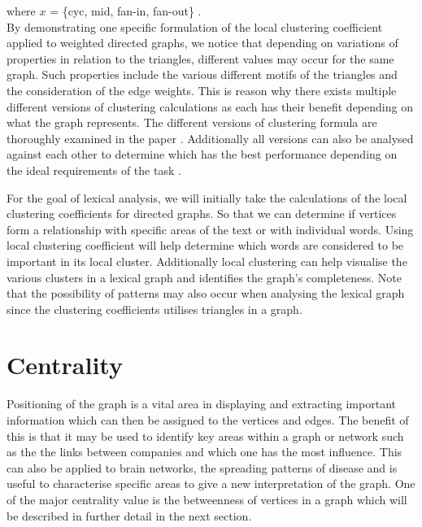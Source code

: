 where $x$ = \{cyc, mid, fan-in, fan-out\} .\\

By demonstrating one specific formulation of the local clustering coefficient applied to weighted directed graphs, we notice that depending on variations of properties in relation to the triangles, different values may occur for the same graph. Such properties include the various different motifs of the triangles and the consideration of the edge weights. This is reason why there exists multiple different versions of clustering calculations as each has their benefit depending on what the graph represents. The different versions of clustering formula are thoroughly examined in the paper \cite{PhysRevResearch.3.043124}. Additionally all versions can also be analysed against each other to determine which has the best performance depending on the ideal requirements of the task \cite{CLEMENTE201826}.

For the goal of lexical analysis, we will initially take the calculations of the local clustering coefficients for directed graphs. So that we can determine if vertices form a relationship with specific areas of the text or with individual words. Using local clustering coefficient will help determine which words are considered to be important in its local cluster. Additionally local clustering can help visualise the various clusters in a lexical graph and identifies the graph's completeness. Note that the possibility of patterns may also occur when analysing the lexical graph since the clustering coefficients utilises triangles in a graph. 

\section{Centrality}
Positioning of the graph is a vital area in displaying and extracting important information which can then be assigned to the vertices and edges. The benefit of this is that it may be used to identify key areas within a graph or network such as the the links between companies and which one has the most influence. This can also be applied to brain networks, the spreading patterns of disease and is useful to characterise specific areas to give a new interpretation of the graph. One of the major centrality value is the betweenness of vertices in a graph which will be described in further detail in the next section.

